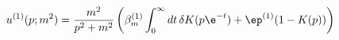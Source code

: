\begin{equation}
u^{(1)}(p; m^2) = \frac{m^2}{p^2 + m^2} \left( \beta_m^{(1)} \int_0^\infty
dt\, \delta K(p \e^{-t}) + \ep^{(1)} (1 - K(p)) \right)
\end{equation}

